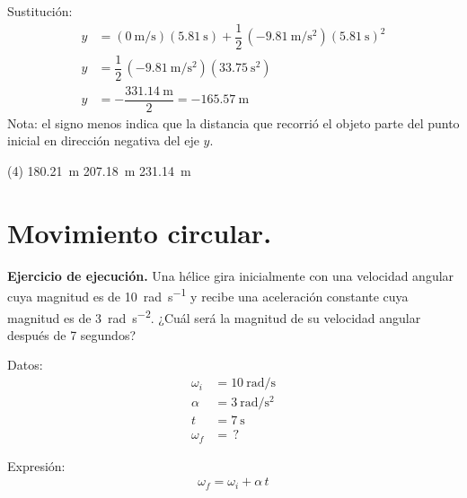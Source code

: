 \documentclass[12pt, letter]{exam}
\begin{document}
\begin{questions}
    Sustitución:
    \begin{align*}
    y &= \left( \displaystyle \SI[per-mode=fraction]{0}{\meter\per\second} \right) (\SI{5.81}{\second}) + \dfrac{1}{2} \, \left( \displaystyle -\SI[per-mode=fraction]{9.81}{\meter\per\square\second} \right) \left(\SI{5.81}{\second} \right)^{2} \\[0.5em]
    y &= \dfrac{1}{2} \, \left( \displaystyle -\SI[per-mode=fraction]{9.81}{\meter\per\square\second} \right) \left(\SI{33.75}{\square\second} \right) \\[0.5em]
    y &= - \dfrac{\SI{331.14}{\meter}}{2} = - \SI{165.57}{\meter}
    \end{align*}
    Nota: el signo menos indica que la distancia que recorrió el objeto parte del punto inicial en dirección negativa del eje $y$.
    \begin{tasks}(4)
        \task {}
        \task \SI{180.21}{\meter}
        \task \SI{207.18}{\meter}
        \task \SI{231.14}{\meter}
    \end{tasks}
    

    \section{Movimiento circular.}

    \setcounter{question}{11} \question \label{Ejercicio_09} \textbf{Ejercicio de ejecución. } Una hélice gira inicialmente con una velocidad angular cuya magnitud es de \SI{10}{\radian\per\second} y recibe una aceleración constante cuya magnitud es de \SI{3}{\radian\per\square\second}. ¿Cuál será la magnitud de su velocidad angular después de \num{7} segundos?

    \begin{minipage}[t]{0.35\linewidth}
    Datos: 
    \begin{align*}
    \omega_{i} &= \SI{10}{\radian\per\second} \\
    \alpha &= \SI{3}{\radian\per\square\second} \\
    t &= \SI{7}{\second} \\
    \omega_{f} &= \, ?
    \end{align*}
    \end{minipage}
    \hspace{1cm}
    \begin{minipage}[t]{0.4\linewidth}
    Expresión:
    \begin{align*}
    \omega_{f} = \omega_{i} + \alpha \, t
    \end{align*}
    \end{minipage}


\end{questions}
\end{document}
